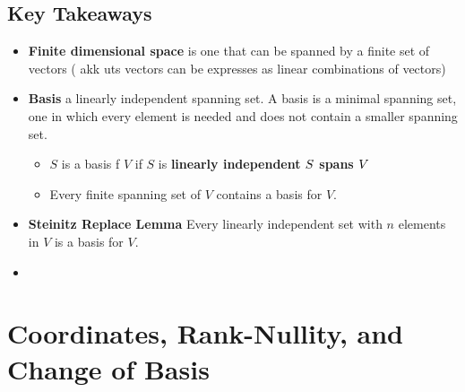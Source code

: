 \documentclass[a4paper, 9pt]{extarticle}
\begin{document}
\subsection{Key Takeaways}
\begin{takeaway-box}{}{}
\begin{itemize}
  \item \textbf{Finite dimensional space} is one that can be spanned by a finite set of vectors ( akk uts vectors can be expresses as linear combinations of vectors)
  \item \textbf{Basis} a linearly independent spanning set. A basis is a minimal spanning set, one in which every element is needed and does not contain a smaller spanning set.
        \begin{itemize}
          \item $S$ is a basis f $V$ if $S$ is \textbf{linearly independent}  \textbf{$\boldmath{S}$ spans $\boldmath{V}$}
          \item Every finite spanning set of $V$ contains a basis for $V$.
        \end{itemize}
  \item \textbf{Steinitz Replace Lemma} Every linearly independent set with $n$ elements in $V$ is a basis for $V$.
  \item
\end{itemize}
\end{takeaway-box}
\section{Coordinates, Rank-Nullity, and Change of Basis}
\end{document}
